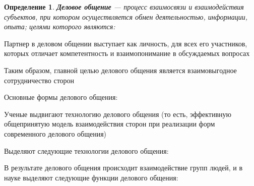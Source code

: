 \documentclass{article}
\newtheorem{definition}{Определение}
\begin{document}
\begin{definition}
    \textbf{Деловое общение} — процесс взаимосвязи и взаимодействия субъектов, при котором осуществляется обмен деятельностью, информации, опыта; целями которого являются:
    \begin{multienumerate}
    \end{multienumerate}
\end{definition}

Партнер в деловом общении выступает как личность, для всех его участников, которых отличает компетентность и взаимопонимание в обсуждаемых вопросах

Таким образом, главной целью делового общения является взаимовыгодное сотрудничество сторон

Основные формы делового общения:
\begin{multienumerate}
\end{multienumerate}

Ученые выдвигают технологию делового общения (то есть, эффективную общепринятую модель взаимодействия сторон при реализации форм современного делового общения)

Выделяют следующие технологии делового общения:
\begin{multienumerate}
\end{multienumerate}

В результате делового общения происходит взаимодействие групп людей, и в науке выделяют следующие функции делового общения:

\begin{multienumerate}
\end{multienumerate}
\end{document}
